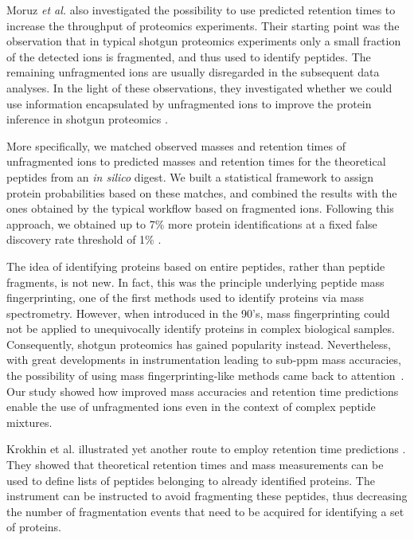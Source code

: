 \documentclass[a4paper]{article}
\begin{document}
Moruz {\em et al.} also investigated the possibility to use predicted
retention times to increase the throughput of proteomics
experiments. Their starting point was the observation that in typical
shotgun proteomics experiments only a small fraction of the detected
ions is fragmented, and thus used to identify peptides. The remaining
unfragmented ions are usually disregarded in the subsequent data
analyses. In the light of these observations, they investigated
whether we could use information encapsulated by unfragmented ions to
improve the protein inference in shotgun proteomics \cite{mf}.



More specifically, we matched observed masses and retention times of
unfragmented ions to predicted masses and retention times for the
theoretical peptides from an {\it in silico} digest. We built a
statistical framework to assign protein probabilities based on these
matches, and combined the results with the ones obtained by the
typical workflow based on fragmented ions. Following this approach, we
obtained up to 7\% more protein identifications at a fixed false
discovery rate threshold of 1\% \cite{mf}.

The idea of identifying proteins based on entire peptides, rather than
peptide fragments, is not new. In fact, this was the principle
underlying peptide mass fingerprinting, one of the first methods used
to identify proteins via mass spectrometry. However, when introduced
in the 90's, mass fingerprinting could not be applied to unequivocally
identify proteins in complex biological samples. Consequently, shotgun
proteomics has gained popularity instead. Nevertheless, with great
developments in instrumentation leading to sub-ppm mass accuracies,
the possibility of using mass fingerprinting-like methods came back to
attention~\cite{iamt1}. Our study showed how improved mass accuracies
and retention time predictions enable the use of unfragmented ions
even in the context of complex peptide mixtures. 

Krokhin et al. illustrated yet another route to employ retention time
predictions \cite{krokhin200612, McQueen2012}. They showed that
theoretical retention times and mass measurements can be used to
define lists of peptides belonging to already identified proteins. The
instrument can be instructed to avoid fragmenting these peptides, thus
decreasing the number of fragmentation events that need to be acquired
for identifying a set of proteins.
\end{document}
